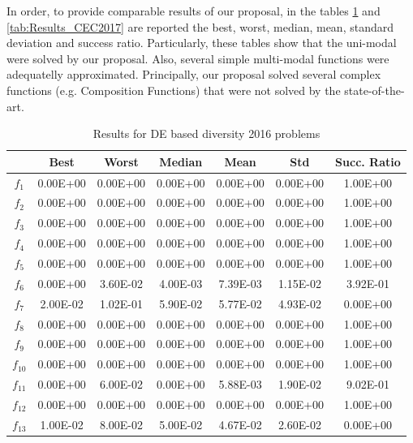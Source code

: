 In order, to provide comparable results of our proposal, in the tables \ref{tab:Results_CEC2016} and \ref{tab:Results_CEC2017} are reported the best, worst, median, mean, standard deviation and success ratio.
%
Particularly, these tables show that the uni-modal were solved by our proposal.
%
Also, several simple multi-modal functions were adequatelly approximated.
%
Principally, our proposal solved several complex functions (e.g. Composition Functions) that were not solved by the state-of-the-art.
%
\begin{table}[t]
\begin{scriptsize}
\centering
\caption{Results for DE based diversity \CEC{} 2016 problems}
\label{tab:Results_CEC2016}
\begin{tabular}{|c|c|c|c|c|c|c|}
\hline
 & \textbf{Best} & \textbf{Worst} & \textbf{Median} & \textbf{Mean} & \textbf{Std} & \textbf{Succ. Ratio} \\ \hline
$f_1$ & 0.00E+00 & 0.00E+00 & 0.00E+00 & 0.00E+00 & 0.00E+00 & 1.00E+00 \\ \hline
$f_2$ & 0.00E+00 & 0.00E+00 & 0.00E+00 & 0.00E+00 & 0.00E+00 & 1.00E+00 \\ \hline
$f_3$ & 0.00E+00 & 0.00E+00 & 0.00E+00 & 0.00E+00 & 0.00E+00 & 1.00E+00 \\ \hline
$f_4$ & 0.00E+00 & 0.00E+00 & 0.00E+00 & 0.00E+00 & 0.00E+00 & 1.00E+00 \\ \hline
$f_5$ & 0.00E+00 & 0.00E+00 & 0.00E+00 & 0.00E+00 & 0.00E+00 & 1.00E+00 \\ \hline
$f_6$ & 0.00E+00 & 3.60E-02 & 4.00E-03 & 7.39E-03 & 1.15E-02 & 3.92E-01 \\ \hline
$f_7$ & 2.00E-02 & 1.02E-01 & 5.90E-02 & 5.77E-02 & 4.93E-02 & 0.00E+00 \\ \hline
$f_8$ & 0.00E+00 & 0.00E+00 & 0.00E+00 & 0.00E+00 & 0.00E+00 & 1.00E+00 \\ \hline
$f_9$ & 0.00E+00 & 0.00E+00 & 0.00E+00 & 0.00E+00 & 0.00E+00 & 1.00E+00 \\ \hline
$f_{10}$ & 0.00E+00 & 0.00E+00 & 0.00E+00 & 0.00E+00 & 0.00E+00 & 1.00E+00 \\ \hline
$f_{11}$ & 0.00E+00 & 6.00E-02 & 0.00E+00 & 5.88E-03 & 1.90E-02 & 9.02E-01 \\ \hline
$f_{12}$ & 0.00E+00 & 0.00E+00 & 0.00E+00 & 0.00E+00 & 0.00E+00 & 1.00E+00 \\ \hline
$f_{13}$ & 1.00E-02 & 8.00E-02 & 5.00E-02 & 4.67E-02 & 2.60E-02 & 0.00E+00 \\ \hline

\end{tabular}
\end{scriptsize}
\end{table}
